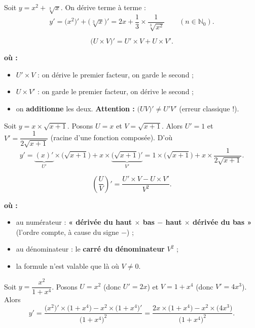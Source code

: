 \documentclass[11pt,a4paper]{article}
\newenvironment{ou}{%
  \par\smallskip\noindent\textbf{où :}\nopagebreak
  \begin{itemize}[leftmargin=1.8em,topsep=2pt,itemsep=1.5pt,parsep=0pt]}%
  {\end{itemize}}
\begin{document}
\begin{exemple}
Soit $y=x^2+\sqrt[3]{x}$. On dérive terme à terme :
\[
   y'=\big(x^2\big)'+\big(\sqrt[3]{x}\big)'
     =2x+\frac13\times\frac{1}{\sqrt[3]{x^2}}\qquad (n\in\mathbb{N}_0).
\]
\end{exemple}

\begin{formule}
\[
   \big(U\times V\big)' = U'\times V + U\times V'.
\]
\end{formule}
\begin{ou}
  \item $U'\times V$ : on dérive le premier facteur, on garde le second ;
  \item $U\times V'$ : on garde le premier facteur, on dérive le second ;
  \item on \textbf{additionne} les deux. \textbf{Attention :} $\big(UV\big)'\neq U'V'$ (erreur classique !).
\end{ou}

\begin{exemple}
Soit $y=x\times\sqrt{x+1}$. Posons $U=x$ et $V=\sqrt{x+1}$. Alors $U'=1$ et
$V'=\dfrac{1}{2\sqrt{x+1}}$ (racine d'une fonction composée). D'où
\[
   y'=\underbrace{(x)'}_{U'}\times\big(\sqrt{x+1}\big)+x\times\underbrace{\big(\sqrt{x+1}\big)'}_{V'}
     =1\times\big(\sqrt{x+1}\big)+x\times\frac{1}{2\sqrt{x+1}}.
\]
\end{exemple}

\begin{formule}
\[
   \left(\frac{U}{V}\right)' = \frac{U'\times V - U\times V'}{V^2}.
\]
\end{formule}
\begin{ou}
  \item au numérateur : \textbf{« dérivée du haut $\times$ bas $-$ haut $\times$ dérivée du bas »}
        (l'ordre compte, à cause du signe $-$) ;
  \item au dénominateur : le \textbf{carré du dénominateur} $V^2$ ;
  \item la formule n'est valable que là où $V\neq 0$.
\end{ou}

\begin{exemple}
Soit $y=\dfrac{x^2}{1+x^4}$. Posons $U=x^2$ (donc $U'=2x$) et $V=1+x^4$ (donc $V'=4x^3$). Alors
\[
   y'=\frac{\big(x^2\big)'\times\big(1+x^4\big)-x^2\times\big(1+x^4\big)'}{\big(1+x^4\big)^2}
     =\frac{2x\times\big(1+x^4\big)-x^2\times\big(4x^3\big)}{\big(1+x^4\big)^2}.
\]
\end{exemple}
\end{document}
